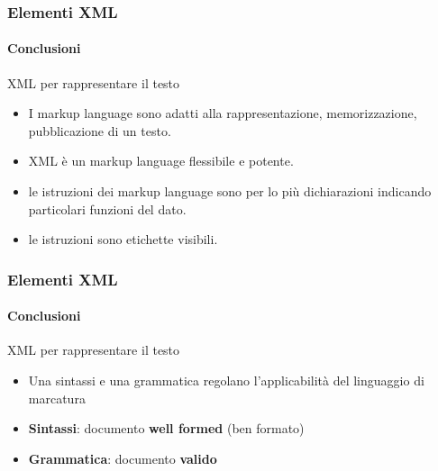 \begin{frame}
    \frametitle{Elementi XML}
    \framesubtitle{Conclusioni}
    \addtocounter{nframe}{1}

    \begin{block}{XML per rappresentare il testo}
        \begin{itemize}
            \item I markup language sono adatti alla rappresentazione, memorizzazione, pubblicazione di un testo.
            \item XML è un markup language flessibile e potente.
        \end{itemize}

        \begin{itemize}
            \item le istruzioni dei markup language sono per lo più dichiarazioni indicando particolari funzioni del dato.
            \item le istruzioni sono etichette visibili.
        \end{itemize}
        
    \end{block}

\end{frame}

\begin{frame}
    \frametitle{Elementi XML}
    \framesubtitle{Conclusioni}
    \addtocounter{nframe}{1}

    \begin{block}{XML per rappresentare il testo}
        \begin{itemize}
            \item Una sintassi e una grammatica regolano l'applicabilità del linguaggio di marcatura
            \item \textbf{Sintassi}: documento \textbf{well formed} (ben formato)
            \item \textbf{Grammatica}: documento \textbf{valido}
        \end{itemize}

    \end{block}

\end{frame}


